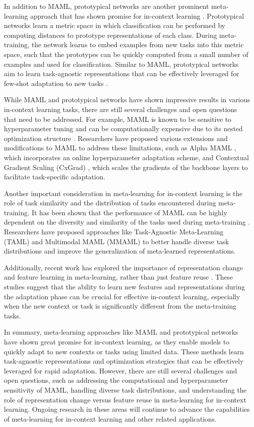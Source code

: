 \documentclass[11pt]{article}
\begin{document}
In addition to MAML, prototypical networks are another prominent meta-learning approach that has shown promise for in-context learning \cite{ref100}. Prototypical networks learn a metric space in which classification can be performed by computing distances to prototype representations of each class. During meta-training, the network learns to embed examples from new tasks into this metric space, such that the prototypes can be quickly computed from a small number of examples and used for classification. Similar to MAML, prototypical networks aim to learn task-agnostic representations that can be effectively leveraged for few-shot adaptation to new tasks \cite{ref100}.

While MAML and prototypical networks have shown impressive results in various in-context learning tasks, there are still several challenges and open questions that need to be addressed. For example, MAML is known to be sensitive to hyperparameter tuning and can be computationally expensive due to its nested optimization structure \cite{ref101}. Researchers have proposed various extensions and modifications to MAML to address these limitations, such as Alpha MAML \cite{ref102}, which incorporates an online hyperparameter adaptation scheme, and Contextual Gradient Scaling (CxGrad) \cite{ref103}, which scales the gradients of the backbone layers to facilitate task-specific adaptation.

Another important consideration in meta-learning for in-context learning is the role of task similarity and the distribution of tasks encountered during meta-training. It has been shown that the performance of MAML can be highly dependent on the diversity and similarity of the tasks used during meta-training \cite{ref104}. Researchers have proposed approaches like Task-Agnostic Meta-Learning (TAML) \cite{ref105} and Multimodal MAML (MMAML) \cite{ref106} to better handle diverse task distributions and improve the generalization of meta-learned representations.

Additionally, recent work has explored the importance of representation change and feature learning in meta-learning, rather than just feature reuse \cite{ref107,ref108}. These studies suggest that the ability to learn new features and representations during the adaptation phase can be crucial for effective in-context learning, especially when the new context or task is significantly different from the meta-training tasks.

In summary, meta-learning approaches like MAML and prototypical networks have shown great promise for in-context learning, as they enable models to quickly adapt to new contexts or tasks using limited data. These methods learn task-agnostic representations and optimization strategies that can be effectively leveraged for rapid adaptation. However, there are still several challenges and open questions, such as addressing the computational and hyperparameter sensitivity of MAML, handling diverse task distributions, and understanding the role of representation change versus feature reuse in meta-learning for in-context learning. Ongoing research in these areas will continue to advance the capabilities of meta-learning for in-context learning and other related applications.
\end{document}
